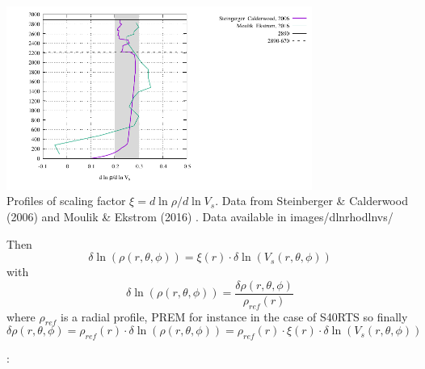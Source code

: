 \begin{center}
\includegraphics[height=6cm]{images/dlnvsdlnrho/xi.pdf}\\
{\captionfont Profiles of scaling factor $\xi=d \ln \rho/d\ln V_s$. Data from 
Steinberger \& Calderwood (2006) \cite{stca06} and Moulik \& Ekstrom (2016) \cite{moek16}.
Data available in images/dlnrhodlnvs/} 
\end{center}

Then
\[
\delta \ln(\rho(r,\theta,\phi)) = \xi(r) \cdot \delta \ln (V_s(r,\theta,\phi) )
\]
with  
\[
\delta \ln (\rho(r,\theta,\phi)) = \frac{ \delta \rho(r,\theta,\phi)}{\rho_{ref}(r)}
\]
where $\rho_{ref}$ is a radial profile, PREM for instance in the case of S40RTS 
so finally 
\[
\delta \rho(r,\theta,\phi) 
= \rho_{ref}(r) \cdot  \delta \ln(\rho(r,\theta,\phi)) 
= \rho_{ref}(r)\cdot \xi(r) \cdot \delta \ln(V_s(r,\theta,\phi)) 
\]






\Literature: \cite{roma01}
